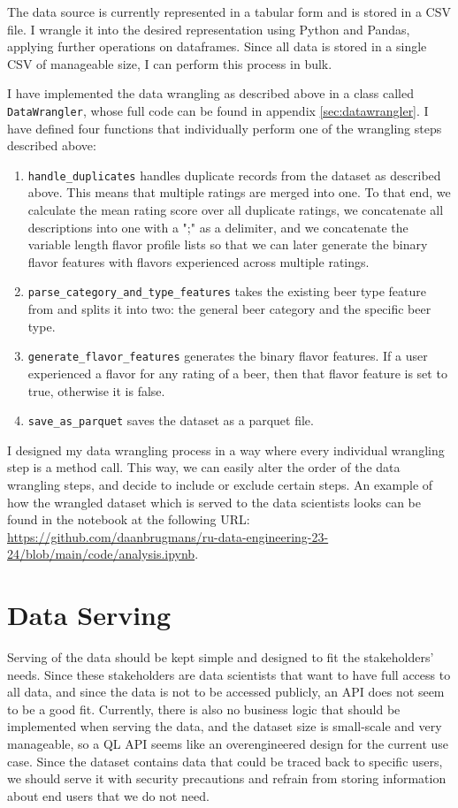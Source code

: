 \documentclass[sigconf]{acmart}
\begin{document}
The \citeauthor{untappd} data source is currently represented in a tabular form and is stored in a CSV file.
I wrangle it into the desired representation using Python and Pandas, applying further operations on dataframes.
Since all data is stored in a single CSV of manageable size, I can perform this process in bulk.

I have implemented the data wrangling as described above in a class called \texttt{DataWrangler}, whose full code can be found in appendix \ref{sec:datawrangler}.
I have defined four functions that individually perform one of the wrangling steps described above:
\begin{enumerate}
  \item \texttt{handle\_duplicates} handles duplicate records from the dataset as described above.
  This means that multiple ratings are merged into one.
  To that end, we calculate the mean rating score over all duplicate ratings, we concatenate all descriptions into one with a ";" as a delimiter, and we concatenate the variable length flavor profile lists so that we can later generate the binary flavor features with flavors experienced across multiple ratings.
  \item \texttt{parse\_category\_and\_type\_features} takes the existing beer type feature from \citeauthor{untappd} and splits it into two: the general beer category and the specific beer type.
  \item \texttt{generate\_flavor\_features} generates the binary flavor features.
  If a user experienced a flavor for any rating of a beer, then that flavor feature is set to true, otherwise it is false.
  \item \texttt{save\_as\_parquet} saves the dataset as a parquet file.
\end{enumerate}

I designed my data wrangling process in a way where every individual wrangling step is a method call.
This way, we can easily alter the order of the data wrangling steps, and decide to include or exclude certain steps.
An example of how the wrangled dataset which is served to the data scientists looks can be found in the notebook at the following URL: \url{https://github.com/daanbrugmans/ru-data-engineering-23-24/blob/main/code/analysis.ipynb}.

\section{Data Serving}
Serving of the data should be kept simple and designed to fit the stakeholders' needs.
Since these stakeholders are data scientists that want to have full access to all data, and since the data is not to be accessed publicly, an API does not seem to be a good fit.
Currently, there is also no business logic that should be implemented when serving the data, and the dataset size is small-scale and very manageable, so a QL API seems like an overengineered design for the current use case.
Since the dataset contains data that could be traced back to specific users, we should serve it with security precautions and refrain from storing information about end users that we do not need.
\end{document}
